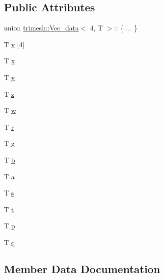 \subsection*{Public Attributes}
\begin{DoxyCompactItemize}
\item 
union \hyperlink{structtrimesh_1_1Vec__data}{trimesh\+::\+Vec\+\_\+data}$<$ 4, T $>$\+:: \{ ... \}  
\item 
T \hyperlink{structtrimesh_1_1Vec__data_3_014_00_01T_01_4_a50a97e6c2d1045eded3fd5d6740df6f8}{v} \mbox{[}4\mbox{]}
\item 
T \hyperlink{structtrimesh_1_1Vec__data_3_014_00_01T_01_4_a3a3c8ae9f8261f3e408cd4a556b8456a}{x}
\item 
T \hyperlink{structtrimesh_1_1Vec__data_3_014_00_01T_01_4_a8fce5387f67d163d6dadb97bf74d6f53}{y}
\item 
T \hyperlink{structtrimesh_1_1Vec__data_3_014_00_01T_01_4_a5a497d26f1a4a19f447034b8fe872522}{z}
\item 
T \hyperlink{structtrimesh_1_1Vec__data_3_014_00_01T_01_4_a41e9509838d543e1e24bc0c5da60d2c5}{w}
\item 
T \hyperlink{structtrimesh_1_1Vec__data_3_014_00_01T_01_4_a4ccd3905aad54f93174ae6c8b5d451ab}{r}
\item 
T \hyperlink{structtrimesh_1_1Vec__data_3_014_00_01T_01_4_ad1edc9a404a725435dfbdadfcdc290b2}{g}
\item 
T \hyperlink{structtrimesh_1_1Vec__data_3_014_00_01T_01_4_a4a06cef1a1058b0ab05e35f582da8c24}{b}
\item 
T \hyperlink{structtrimesh_1_1Vec__data_3_014_00_01T_01_4_a2009688d64af32bbfd5a0fc1e0ac00e6}{a}
\item 
T \hyperlink{structtrimesh_1_1Vec__data_3_014_00_01T_01_4_a73c7011520f994dd7f2a40d8ab28cc06}{s}
\item 
T \hyperlink{structtrimesh_1_1Vec__data_3_014_00_01T_01_4_a3b82531e5e59fae8beb2909e0af9fc04}{t}
\item 
T \hyperlink{structtrimesh_1_1Vec__data_3_014_00_01T_01_4_add91a5521d70be91c3fbf7446035752d}{p}
\item 
T \hyperlink{structtrimesh_1_1Vec__data_3_014_00_01T_01_4_a33c3e7ee93ce11a295faf8e08f9aacc3}{q}
\end{DoxyCompactItemize}


\subsection{Member Data Documentation}
\mbox{\label{structtrimesh_1_1Vec__data_3_014_00_01T_01_4_ac6669bee1075df75b0293210cef20b16}} 
